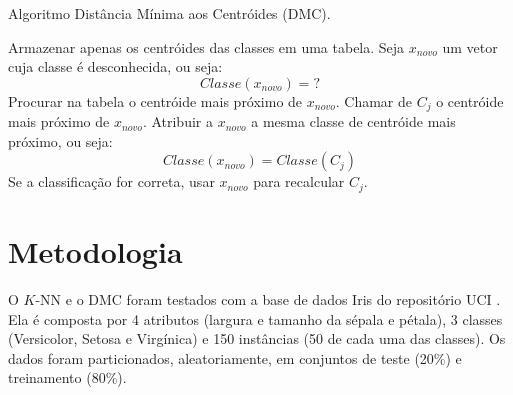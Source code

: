 \documentclass{article}
\begin{document}
\begin{algorithm}[!h]
\caption{Algoritmo Distância Mínima aos Centróides (DMC).}\label{alg:dmc}
\begin{algorithmic}[1]
\STATE Armazenar apenas os centróides das classes em uma tabela.%
\STATE Seja $x_{novo}$ um vetor cuja classe é desconhecida, ou seja:
\begin{equation*}
Classe(x_{novo}) = ?
\end{equation*}
%
\STATE Procurar na tabela o centróide mais próximo de $x_{novo}$.%
\STATE Chamar de $C_j$ o centróide mais próximo de $x_{novo}$.%
\STATE Atribuir a $x_{novo}$ a mesma classe de centróide mais próximo, ou seja:
\begin{equation*}
Classe(x_{novo}) = Classe(C_j)
\end{equation*}
%
\STATE Se a classificação for correta, usar $x_{novo}$ para recalcular $C_j$.
\end{algorithmic}
\end{algorithm}

 

\section{Metodologia}

O $K$-NN e o DMC foram testados com a base de dados Iris do repositório UCI \cite{Lichman:2013}. Ela é composta por 4 atributos (largura e tamanho da sépala e pétala), 3 classes (Versicolor, Setosa e Virgínica)  e 150 instâncias (50 de cada uma das classes). Os dados foram particionados, aleatoriamente, em conjuntos de teste (20\%) e treinamento (80\%).
\end{document}
